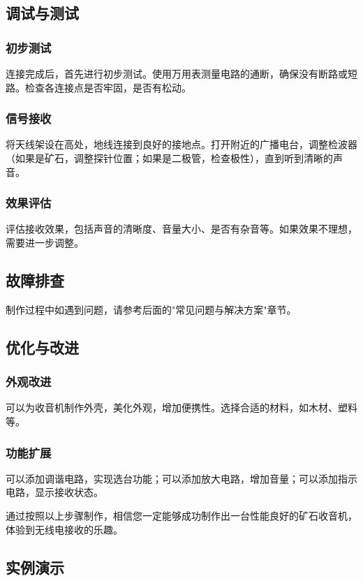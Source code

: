 \documentclass[12pt,UTF8]{ctexbook}
\begin{document}
\subsection{调试与测试}

\subsubsection{初步测试}
连接完成后，首先进行初步测试。使用万用表测量电路的通断，确保没有断路或短路。检查各连接点是否牢固，是否有松动。

\subsubsection{信号接收}
将天线架设在高处，地线连接到良好的接地点。打开附近的广播电台，调整检波器（如果是矿石，调整探针位置；如果是二极管，检查极性），直到听到清晰的声音。

\subsubsection{效果评估}
评估接收效果，包括声音的清晰度、音量大小、是否有杂音等。如果效果不理想，需要进一步调整。

\subsection{故障排查}

制作过程中如遇到问题，请参考后面的"常见问题与解决方案"章节。

\subsection{优化与改进}

\subsubsection{外观改进}
可以为收音机制作外壳，美化外观，增加便携性。选择合适的材料，如木材、塑料等。

\subsubsection{功能扩展}
可以添加调谐电路，实现选台功能；可以添加放大电路，增加音量；可以添加指示电路，显示接收状态。

通过按照以上步骤制作，相信您一定能够成功制作出一台性能良好的矿石收音机，体验到无线电接收的乐趣。

\subsection{实例演示}
\end{document}
